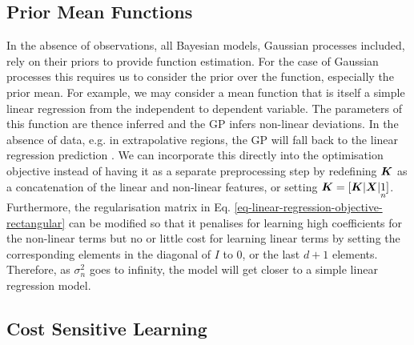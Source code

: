 \documentclass[useAMS,usenatbib,fleqn]{mn2e}
\begin{document}
\subsection{Prior Mean Functions}

In the absence of observations, all Bayesian models, Gaussian processes included, rely on their priors to provide function estimation. For the case of Gaussian processes this requires us to consider the prior over the function, especially the prior mean. For example, we may consider a mean function that is itself a simple linear regression from the independent to dependent variable. The parameters of this function are thence inferred and the GP infers non-linear deviations. In the absence of data, e.g. in extrapolative regions, the GP will fall back to the linear regression prediction \citep{roberts2012rs}. We can incorporate this directly into the optimisation objective instead of having it as a separate preprocessing step by redefining $\bmath{K}$ as a concatenation of the linear and non-linear features, or setting $\bmath{K}=[\bmath{K}|\bmath{X}|\underset{n}{1}]$. Furthermore, the regularisation matrix in Eq. \eqref{eq-linear-regression-objective-rectangular} can be modified so that it penalises for learning high coefficients for the non-linear terms but no or little cost for learning linear terms by setting the corresponding elements in the diagonal of $I$ to 0, or the last $d+1$ elements. Therefore, as $\sigma_{n}^{2}$ goes to infinity, the model will get closer to a simple linear regression model.

\subsection{Cost Sensitive Learning}
\end{document}
